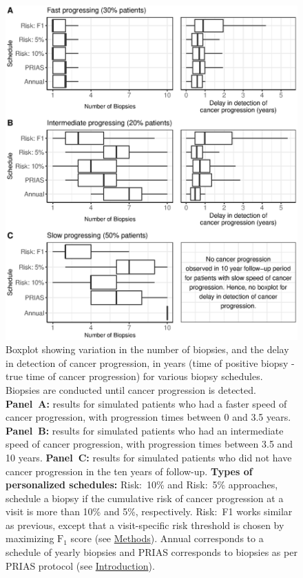 \begin{figure}[!htb]
\captionsetup{justification=justified}
\centerline{\includegraphics[width=\columnwidth]{images/sim_res_combined.eps}}
\caption{Boxplot showing variation in the number of biopsies, and the delay in detection of cancer progression, in years (time of positive biopsy - true time of cancer progression) for various biopsy schedules. Biopsies are conducted until cancer progression is detected. \textbf{Panel~A:} results for simulated patients who had a faster speed of cancer progression, with progression times between 0 and 3.5 years. \textbf{Panel~B:} results for simulated patients who had an intermediate speed of cancer progression, with progression times between 3.5 and 10 years. \textbf{Panel~C:} results for simulated patients who did not have cancer progression in the ten years of follow-up. \textbf{Types of personalized schedules:} Risk:~10\% and Risk:~5\% approaches, schedule a biopsy if the cumulative risk of cancer progression at a visit is more than 10\% and 5\%, respectively. Risk:~F1 works similar as previous, except that a visit-specific risk threshold is chosen by maximizing $\mbox{F}_1$ score (see \hyperref[sec:methods]{Methods}). Annual corresponds to a schedule of yearly biopsies and PRIAS corresponds to biopsies as per PRIAS protocol (see \hyperref[sec:introduction]{Introduction}).}
\label{fig:sim_res_combined}
\end{figure}

